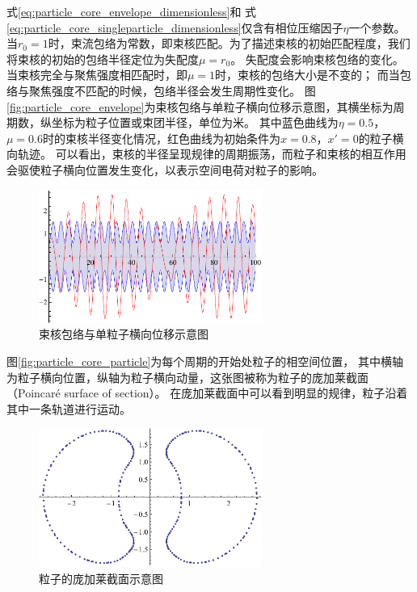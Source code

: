 式\eqref{eq:particle_core_envelope_dimensionless}和
式\eqref{eq:particle_core_singleparticle_dimensionless}仅含有相位压缩因子$\eta$一个参数。
当$r_0=1$时，束流包络为常数，即束核匹配。为了描述束核的初始匹配程度，我们将束核的初始的包络半径定位为失配度$\mu = r_{0}$。
失配度会影响束核包络的变化。当束核完全与聚焦强度相匹配时，即$\mu = 1$时，束核的包络大小是不变的；
而当包络与聚焦强度不匹配的时候，包络半径会发生周期性变化。
图\eqref{fig:particle_core_envelope}为束核包络与单粒子横向位移示意图，其横坐标为周期数，纵坐标为粒子位置或束团半径，单位为米。
其中蓝色曲线为$\eta = 0.5$，$\mu = 0.6$时的束核半径变化情况，红色曲线为初始条件为$x=0.8$，$x'=0$的粒子横向轨迹。
可以看出，束核的半径呈现规律的周期振荡，而粒子和束核的相互作用会驱使粒子横向位置发生变化，以表示空间电荷对粒子的影响。
\begin{figure}[!tbh]
    \centering
    \includegraphics[width=0.65\textwidth]{Img/particle_core_envelope.pdf}
    \caption{束核包络与单粒子横向位移示意图}
    \label{fig:particle_core_envelope}
\end{figure}

图\eqref{fig:particle_core_particle}为每个周期的开始处粒子的相空间位置，
其中横轴为粒子横向位置，纵轴为粒子横向动量，这张图被称为粒子的庞加莱截面（Poincaré surface of section）。
在庞加莱截面中可以看到明显的规律，粒子沿着其中一条轨道进行运动。
\begin{figure}[!tbh]
    \centering
    \includegraphics[width=0.65\textwidth]{Img/particle_core_particle.pdf}
    \caption{粒子的庞加莱截面示意图}
    \label{fig:particle_core_particle}
\end{figure}

